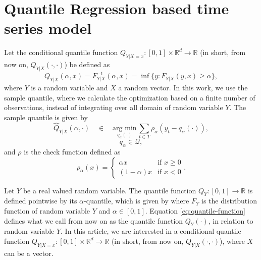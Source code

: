 \section{Quantile Regression based time series model}

Let the conditional quantile function $Q_{Y|X=x}:[0,1] \times \mathbb{R}^d \rightarrow \mathbb{R}$ (in short, from now on, $Q_{Y|X}(\cdot, \cdot)$) be defined as 
\begin{equation}
Q_{Y|X}(\alpha,x) = F_{Y|X}^{-1}(\alpha,x) = \inf\{y: F_{Y|X}(y,x) \geq \alpha\},
\label{eq:quantile-function}
\end{equation}
where $Y$ is a random variable and $X$ a random vector. 
In this work, we use the sample quantile,  where we calculate the optimization based on a finite number of observations, instead of integrating over all domain of random variable $Y$.
The sample quantile is given by 
\begin{equation}
\hat{Q}_{Y|X}(\alpha, \cdot)\quad \in\quad\underset{q_\alpha(\cdot)}{\text{arg min}}\,\sum_{t \in T} \rho_\alpha(y_{t}-q_\alpha(\cdot)),
\label{eq:linear-model}
\end{equation}
\begin{equation}
q_\alpha  \in \mathcal{Q},
\end{equation}
and $\rho$ is the check function defined as
\begin{equation}\label{eq:check-function}
\rho_{\alpha}(x)=\begin{cases}
\alpha x & \text{if }x\geq0\\
(1-\alpha)x & \text{if }x<0
\end{cases}.
\end{equation}

Let $Y$ be a real valued random variable. The quantile function $Q_Y:[0,1] \rightarrow \mathbb{R}$ is defined pointwise by its $\alpha$-quantile, which is given by
where $F_Y$ is the distribution function of random variable $Y$ and $\alpha \in [0,1]$. Equation \ref{eq:quantile-function} defines what we call from now on as the quantile function $Q_Y(\cdot)$, in relation to random variable $Y$. In this article, we are interested in a conditional quantile function $Q_{Y|X=x}:[0,1] \times \mathbb{R}^d \rightarrow \mathbb{R}$ (in short, from now on, $Q_{Y|X}(\cdot, \cdot)$), where $X$ can be a vector.


